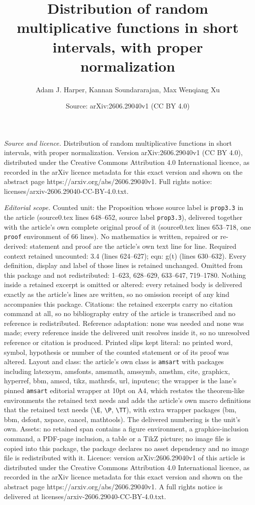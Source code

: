 \documentclass[10pt,a4paper]{amsart}
\title[Distribution of random multiplicative functions in short int]{Distribution of random multiplicative functions in short intervals, with proper normalization}
\author{Adam J. Harper, Kannan Soundararajan, Max Wenqiang Xu}
\date{Source: arXiv:2606.29040v1 (CC BY 4.0)}
\begin{document}
\maketitle

\noindent\emph{Source and licence.} Distribution of random multiplicative functions in short intervals, with proper normalization. Version arXiv:2606.29040v1 (CC BY 4.0), distributed under the Creative Commons Attribution 4.0 International licence, as recorded in the arXiv licence metadata for this exact version and shown on the abstract page https://arxiv.org/abs/2606.29040v1. Full rights notice: licenses/arxiv-2606.29040-CC-BY-4.0.txt.\par\smallskip

\noindent\textit{Editorial scope.} Counted unit: the Proposition whose source label is \texttt{prop3.3} in the article (source0.tex lines 648--652, source label \texttt{prop3.3}), delivered together with the article's own complete original proof of it (source0.tex lines 653--718, one \texttt{proof} environment of 66 lines). No mathematics is written, repaired or re-derived: statement and proof are the article's own text line for line. Required context retained uncounted: 3.4 (lines 624--627); eqn: g(t) (lines 630--632). Every definition, display and label of those lines is retained unchanged. Omitted from this package and not redistributed: 1--623, 628--629, 633--647, 719--1780. Nothing inside a retained excerpt is omitted or altered: every retained body is delivered exactly as the article's lines are written, so no omission receipt of any kind accompanies this package. Citations: the retained excerpts carry no citation command at all, so no bibliography entry of the article is transcribed and no reference is redistributed. Reference adaptation: none was needed and none was made; every reference inside the delivered unit resolves inside it, so no unresolved reference or citation is produced. Printed slips kept literal: no printed word, symbol, hypothesis or number of the counted statement or of its proof was altered. Layout and class: the article's own class is \texttt{amsart} with packages including latexsym, amsfonts, amsmath, amssymb, amsthm, cite, graphicx, hyperref, bbm, amscd, tikz, mathrsfs, url, inputenc; the wrapper is the lane's pinned \texttt{amsart} editorial wrapper at 10pt on A4, which restates the theorem-like environments the retained text needs and adds the article's own macro definitions that the retained text needs (\texttt{\textbackslash E}, \texttt{\textbackslash P}, \texttt{\textbackslash TT}), with extra wrapper packages (bm, bbm, dsfont, xspace, cancel, mathtools). The delivered numbering is the unit's own. Assets: no retained span contains a figure environment, a graphics-inclusion command, a PDF-page inclusion, a table or a TikZ picture; no image file is copied into this package, the package declares no asset dependency and no image file is redistributed with it. Licence: version arXiv:2606.29040v1 of this article is distributed under the Creative Commons Attribution 4.0 International licence, as recorded in the arXiv licence metadata for this exact version and shown on the abstract page https://arxiv.org/abs/2606.29040v1. A full rights notice is delivered at licenses/arxiv-2606.29040-CC-BY-4.0.txt. 
\end{document}

